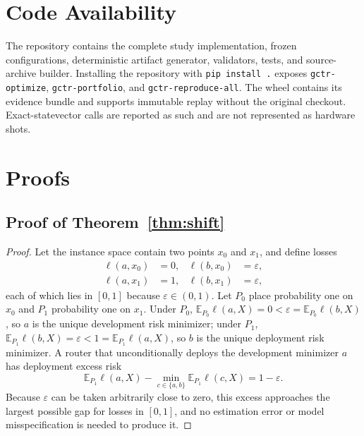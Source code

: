 \documentclass[aps,prx,reprint,superscriptaddress,floatfix]{revtex4-2}
\newcommand{\E}{\mathbb{E}}
\begin{document}
\section*{Code Availability}
The repository contains the complete study implementation, frozen
configurations, deterministic artifact generator, validators, tests, and
source-archive builder.  Installing the repository with
\texttt{pip install .} exposes \texttt{gctr-optimize},
\texttt{gctr-portfolio}, and \texttt{gctr-reproduce-all}.  The wheel contains
its evidence bundle and supports immutable replay without the original
checkout.  Exact-statevector
calls are reported as such and are not represented as hardware shots.

\clearpage



\clearpage
\appendix

\section{Proofs}

\subsection{Proof of Theorem~\ref{thm:shift}}
\label{app:proof-shift}

\begin{proof}
Let the instance space contain two points $x_0$ and $x_1$, and define losses
\[
\begin{aligned}
 \ell(a,x_0)&=0, & \ell(b,x_0)&=\varepsilon,\\
 \ell(a,x_1)&=1, & \ell(b,x_1)&=\varepsilon,
\end{aligned}
\]
each of which lies in $[0,1]$ because $\varepsilon\in(0,1)$.  Let $P_0$ place
probability one on $x_0$ and $P_1$ probability one on $x_1$.  Under $P_0$,
$\E_{P_0}\ell(a,X)=0<\varepsilon=\E_{P_0}\ell(b,X)$, so $a$ is the unique
development risk minimizer; under $P_1$,
$\E_{P_1}\ell(b,X)=\varepsilon<1=\E_{P_1}\ell(a,X)$, so $b$ is the unique
deployment risk minimizer.  A router that unconditionally deploys the development
minimizer $a$ has deployment excess risk
\[
 \E_{P_1}\ell(a,X)-\min_{c\in\{a,b\}}\E_{P_1}\ell(c,X)
 =1-\varepsilon .
\]
Because $\varepsilon$ can be taken arbitrarily close to zero, this excess
approaches the largest possible gap for losses in $[0,1]$, and no estimation
error or model misspecification is needed to produce it.
\end{proof}
\end{document}
